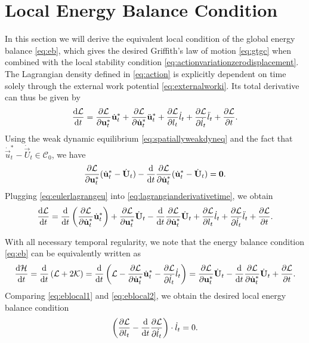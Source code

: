 \section*{Local Energy Balance Condition}
In this section we will derive the equivalent local condition of the global energy balance \eqref{eq:eb}, which gives the desired Griffith's law of motion \eqref{eq:gtgc} when combined with the local stability condition \eqref{eq:actionvariationzerodisplacement}. The Lagrangian density defined in \eqref{eq:action} is explicitly dependent on time solely through the external work potential \eqref{eq:externalworki}. Its total derivative can thus be given by
\begin{equation} \label{eq:lagrangianderivativetime}
\frac{\md\mathcal{L}}{\md t}=\frac{\partial\mathcal{L}}{\partial\vec{u}_t^*}\dot{\vec{u}}_t^*+\frac{\partial\mathcal{L}}{\partial\dot{\vec{u}}_t^*}\ddot{\vec{u}}_t^*+\frac{\partial\mathcal{L}}{\partial l_t}\dot{l}_t+\frac{\partial\mathcal{L}}{\partial\dot{l}_t}\ddot{l}_t+\frac{\partial\mathcal{L}}{\partial t}.
\end{equation}
Using the weak dynamic equilibrium \eqref{eq:spatiallyweakdyneq} and the fact that $\dot{\vec{u}}_t^*-\dot{\vec{U}}_t\in\mathcal{C}_0$, we have
\begin{equation} \label{eq:eulerlagrangeu}
\frac{\partial\mathcal{L}}{\partial\vec{u}_t^*}(\dot{\vec{u}}_t^*-\dot{\vec{U}}_t)-\frac{\md}{\md t}\frac{\partial\mathcal{L}}{\partial\dot{\vec{u}}_t^*}(\dot{\vec{u}}_t^*-\dot{\vec{U}}_t)=\vec{0}.
\end{equation}
Plugging \eqref{eq:eulerlagrangeu} into \eqref{eq:lagrangianderivativetime}, we obtain
\begin{equation} \label{eq:eblocal1}
\frac{\md\mathcal{L}}{\md t}=\frac{\md}{\md t}\left(\frac{\partial\mathcal{L}}{\partial\dot{\vec{u}}_t^*}\dot{\vec{u}}_t^*\right)+\frac{\partial\mathcal{L}}{\partial\vec{u}_t^*}\dot{\vec{U}}_t-\frac{\md}{\md t}\frac{\partial\mathcal{L}}{\partial\dot{\vec{u}}_t^*}\dot{\vec{U}}_t+\frac{\partial\mathcal{L}}{\partial l_t}\dot{l}_t+\frac{\partial\mathcal{L}}{\partial\dot{l}_t}\ddot{l}_t+\frac{\partial\mathcal{L}}{\partial t}.
\end{equation}

With all necessary temporal regularity, we note that the energy balance condition \eqref{eq:eb} can be equivalently written as
\begin{equation} \label{eq:eblocal2}
\frac{\md\mathcal{H}}{\md t}=\frac{\md}{\md t}\left(\mathcal{L}+2\mathcal{K}\right)=\frac{\md}{\md t}\left(\mathcal{L}-\frac{\partial\mathcal{L}}{\partial\dot{\vec{u}}_t^*}\dot{\vec{u}}_t^*-\frac{\partial\mathcal{L}}{\partial\dot{l}_t}\dot{l}_t\right)=\frac{\partial\mathcal{L}}{\partial\vec{u}_t^*}\dot{\vec{U}}_t-\frac{\md}{\md t}\frac{\partial\mathcal{L}}{\partial\dot{\vec{u}}_t^*}\dot{\vec{U}}_t+\frac{\partial\mathcal{L}}{\partial t}.
\end{equation}
Comparing \eqref{eq:eblocal1} and \eqref{eq:eblocal2}, we obtain the desired local energy balance condition
\[
\left(\frac{\partial\mathcal{L}}{\partial l_t}-\frac{\mathrm{d}}{\mathrm{d} t}\frac{\partial\mathcal{L}}{\partial\dot{l}_t}\right)\cdot\dot{l}_t=0.
\]

